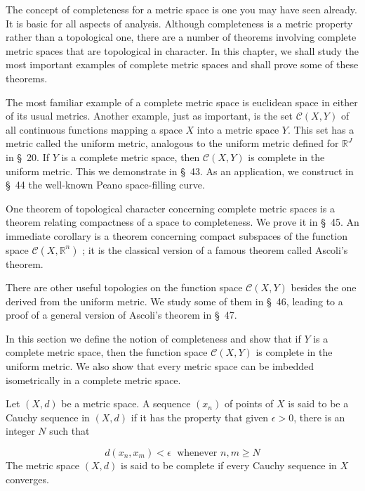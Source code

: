 
The concept of completeness for a metric space is one you may have seen already. It is basic for all aspects of analysis. Although completeness is a metric property rather than a topological one, there are a number of theorems involving complete metric spaces that are topological in character. In this chapter, we shall study the most important examples of complete metric spaces and shall prove some of these theorems.

The most familiar example of a complete metric space is euclidean space in either of its usual metrics. Another example, just as important, is the set \(\mathcal{C}({X,Y})\) of all continuous functions mapping a space \(X\) into a metric space \(Y\). This set has a metric called the uniform metric, analogous to the uniform metric defined for \(\mathbb{R}^{J}\) in \S\ 20. If \(Y\) is a complete metric space, then \(\mathcal{C}({X,Y})\) is complete in the uniform metric. This we demonstrate in \S\ 43. As an application, we construct in \S\ 44 the well-known Peano space-filling curve.

One theorem of topological character concerning complete metric spaces is a theorem relating compactness of a space to completeness. We prove it in \S\ 45. An immediate corollary is a theorem concerning compact subspaces of the function space \(\mathcal{C}({X,\mathbb{R}^{n}})\) ; it is the classical version of a famous theorem called Ascoli's theorem.

There are other useful topologies on the function space \(\mathcal{C}({X,Y})\) besides the one derived from the uniform metric. We study some of them in \S\ 46, leading to a proof of a general version of Ascoli's theorem in \S\ 47.


In this section we define the notion of completeness and show that if \(Y\) is a complete metric space, then the function space \(\mathcal{C}({X,Y})\) is complete in the uniform metric. We also show that every metric space can be imbedded isometrically in a complete metric space.

\begin{definition}
 Let \((X, d)\) be a metric space. A sequence \((x_{n})\) of points of \(X\) is said to be a Cauchy sequence in \((X, d)\) if it has the property that given \(\epsilon > 0\), there is an integer \(N\) such that

\[
d({x_{n},x_{m}}) < \epsilon \;\text{ whenever }n,m \geq N
\]
The metric space \((X, d)\) is said to be complete if every Cauchy sequence in \(X\) converges.
\end{definition}

